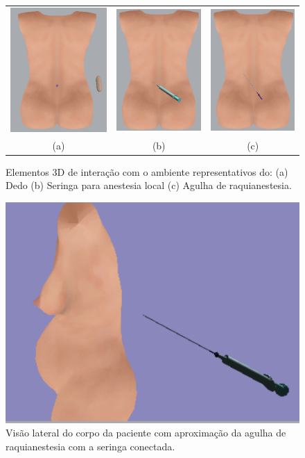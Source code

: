 \begin{figure}[ht!]
    \centering
        \begin{tabular}{ccc}
        \includegraphics[width=0.3\linewidth]{capitulos/figuras/corpo-paciente-apos-apalpacao-dedo.png} & 
        \includegraphics[width=0.27\linewidth]{capitulos/figuras/corpo-paciente-seringa.png} & 
        \includegraphics[width=0.27\linewidth]{capitulos/figuras/corpo-paciente-agulha-raqui.png} 
        \\
        (a) & (b) & (c)
        \end{tabular}
    \caption{Elementos 3D de interação com o ambiente representativos do: (a) Dedo (b) Seringa para anestesia local (c) Agulha de raquianestesia.}
    \label{fig:elementosDeInteracao}
\end{figure}

\begin{figure}[ht!]
    \centering
    \includegraphics[width=0.4\linewidth]{capitulos/figuras/corpo-visao-lateral-agulhaRaquiSeringa.png} 
    \caption{Visão lateral do corpo da paciente com aproximação da agulha de raquianestesia com a seringa conectada.}
    \label{fig:agulhaRaquiSeringa}
\end{figure}

